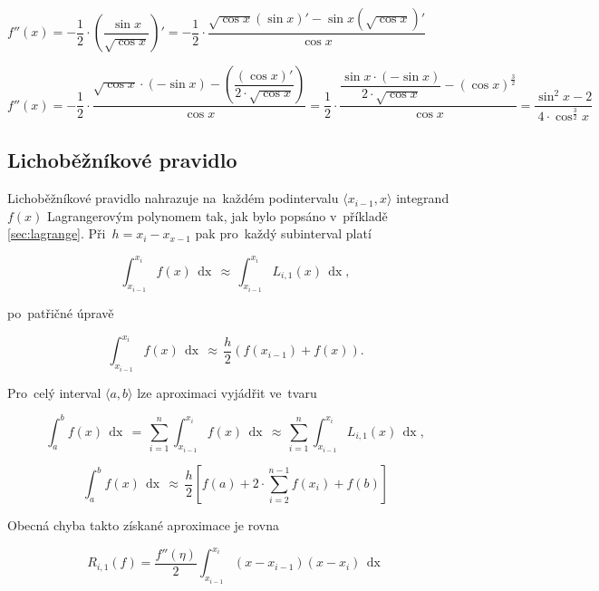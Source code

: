 \documentclass[a4paper,10pt]{article}
\def\d#1{\,\mathop{\mathrm{d}#1}}
\begin{document}
$f''(x)=-\dfrac{1}{2}\cdot\left(\dfrac{\sin{x}}
{\sqrt{\cos{x}}}\right)'=-\dfrac{1}{2}\cdot\dfrac{\sqrt{\cos{x}}(\sin{x})'
-\sin{x}(\sqrt{\cos{x}})'}{\cos{x}}$

$f''(x)=-\dfrac{1}{2}\cdot\dfrac{\sqrt{\cos{x}}\cdot(-\sin{x})
-\left(\dfrac{(\cos{x})'}{2\cdot\sqrt{\cos{x}}}\right)}{\cos{x}}=
\dfrac{1}{2}\cdot\dfrac{\dfrac{\sin{x}\cdot(-\sin{x})}
{2\cdot\sqrt{\cos{x}}}-{(\cos{x})}^{\frac{3}{2}}}{\cos{x}}=
\dfrac{\sin^{2}{x}-2}{4\cdot\cos^{\frac{3}{2}}{x}}$

\subsection{Lichoběžníkové pravidlo}

\par Lichoběžníkové pravidlo nahrazuje na~každém podintervalu $\langle x_{i-1}, x\rangle$
integrand $f(x)$ Lagrangerovým polynomem tak, jak bylo popsáno v~příkladě
\ref{sec:lagrange}. Při~$h=x_i-x_{x-1}$ pak pro~každý subinterval platí

\begin{equation}
\int_{x_{i-1}}^{x_i}f(x)\d{x}\,\approx\,\int_{x_{i-1}}^{x_i}L_{i,1}(x)\d{x},
\end{equation}

po~patřičné úpravě

\begin{equation}
\int_{x_{i-1}}^{x_i}f(x)\d{x}\,\approx\,\dfrac{h}{2}\left( f(x_{i-1})+f(x)\right).
\end{equation}

Pro~celý interval $\langle a, b \rangle$ lze aproximaci vyjádřit ve~tvaru

\begin{equation}
\int_{a}^{b}f(x)\d{x}\,=\,\sum_{i=1}^{n}\int_{x_{i-1}}^{x_i}f(x)\d{x}
\,\approx\,\sum_{i=1}^{n}\int_{x_{i-1}}^{x_i}L_{i,1}(x)\d{x},
\end{equation}

\begin{equation}
\label{eq:integral}
\int_{a}^{b}f(x)\d{x}\,\approx\,\dfrac{h}{2}\left[
f(a)+2\cdot\sum_{i=2}^{n-1}f(x_i)+f(b)
\right]
\end{equation}


\par Obecná chyba takto získané aproximace je rovna

\begin{equation}
R_{i,1}(f)=\dfrac{f''(\eta)}{2} \int_{x_{i-1}}^{x_i}(x-x_{i-1})(x-x_i)\d{x}
\end{equation}
\end{document}
